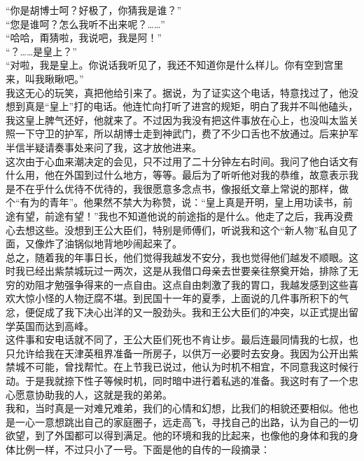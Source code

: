 “你是胡博士呵？好极了，你猜我是谁？”\\

“您是谁呵？怎么我听不出来呢？……”\\

“哈哈，甭猜啦，我说吧，我是阿！”\\

“？……是皇上？”\\

“对啦，我是皇上。你说话我听见了，我还不知道你是什么样儿。你有空到宫里来，叫我瞅瞅吧。”\\

我这无心的玩笑，真把他给引来了。据说，为了证实这个电话，特意找过了，他没想到真是“皇上”打的电话。他连忙向打听了进宫的规矩，明白了我并不叫他磕头，我这皇上脾气还好，他就来了。不过因为我没有把这件事放在心上，也没叫太监关照一下守卫的护军，所以胡博士走到神武门，费了不少口舌也不放通过。后来护军半信半疑请奏事处来问了我，这才放他进来。\\

这次由于心血来潮决定的会见，只不过用了二十分钟左右时间。我问了他白话文有什么用，他在外国到过什么地方，等等。最后为了听听他对我的恭维，故意表示我是不在乎什么优待不优待的，我很愿意多念点书，像报纸文章上常说的那样，做个“有为的青年”。他果然不禁大为称赞，说：“皇上真是开明，皇上用功读书，前途有望，前途有望！”我也不知道他说的前途指的是什么。他走了之后，我再没费心去想这些。没想到王公大臣们，特别是师傅们，听说我和这个“新人物”私自见了面，又像炸了油锅似地背地吵闹起来了。\\

总之，随着我的年事日长，他们觉得我越发不安分，我也觉得他们越发不顺眼。这时我已经出紫禁城玩过一两次，这是从我借口母亲去世要亲往祭奠开始，排除了无穷的劝阻才勉强争得来的一点自由。这点自由刺激了我的胃口，我越发感到这些喜欢大惊小怪的人物迂腐不堪。到民国十一年的夏季，上面说的几件事所积下的气忿，便促成了我下决心出洋的又一股劲头。我和王公大臣们的冲突，以正式提出留学英国而达到高峰。\\

这件事和安电话就不同了，王公大臣们死也不肯让步。最后连最同情我的七叔，也只允许给我在天津英租界准备一所房子，以供万一必要时去安身。我因为公开出紫禁城不可能，曾找帮忙。在上节我已说过，他认为时机不相宜，不同意我这时候行动。于是我就捺下性子等候时机，同时暗中进行着私逃的准备。我这时有了一个忠心愿意协助我的人，这就是我的弟弟。\\

我和，当时真是一对难兄难弟，我们的心情和幻想，比我们的相貌还要相似。他也是一心一意想跳出自己的家庭圈子，远走高飞，寻找自己的出路，认为自己的一切欲望，到了外国都可以得到满足。他的环境和我的比起来，也像他的身体和我的身体比例一样，不过只小了一号。下面是他的自传的一段摘录：\\

